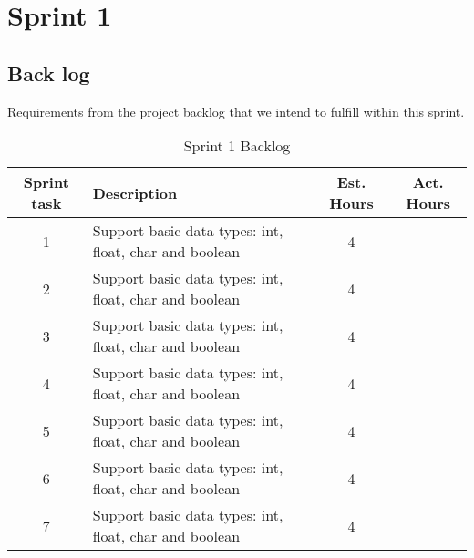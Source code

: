 \chapter{Sprint 1}

\section{Back log}
Requirements from the project backlog that we intend to fulfill within this sprint.

\begin{table}[ht] \center
\caption{Sprint 1 Backlog}
\begin{tabular}{c p{6cm} c  c}
	Sprint task & Description & Est. Hours & Act. Hours \\
	\hline
	1 & Support basic data types: int, float, char and boolean & 4 & \\
	2 & Support basic data types: int, float, char and boolean & 4 & \\	
	3 & Support basic data types: int, float, char and boolean & 4 & \\
	4 & Support basic data types: int, float, char and boolean & 4 & \\
	5 & Support basic data types: int, float, char and boolean & 4 & \\	
	6 & Support basic data types: int, float, char and boolean & 4 & \\
	7 & Support basic data types: int, float, char and boolean & 4 & \\
\end{tabular}
\end{table}

